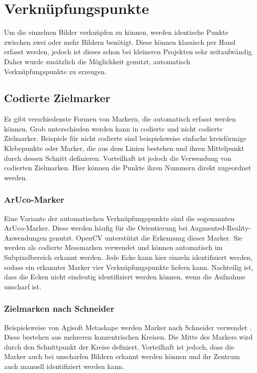 \documentclass[./00PhotoBox.tex]{subfiles}
\begin{document}
\section{Verknüpfungspunkte}
\label{s:verknuepfung}
Um die einzelnen Bilder verknüpfen zu können, werden identische Punkte zwischen zwei oder mehr Bildern benötigt. Diese können klassisch per Hand erfasst werden, jedoch ist dieses schon bei kleineren Projekten sehr zeitaufwändig. Daher wurde zusätzlich die Möglichkeit genutzt, automatisch Verknüpfungspunkte zu erzeugen.

\subsection{Codierte Zielmarker}
Es gibt verschiedenste Formen von Markern, die automatisch erfasst werden können. Grob unterschieden werden kann in codierte und nicht codierte Zielmarker. Beispiele für nicht codierte sind beispielsweise einfache kreisförmige Klebepunkte oder Marker, die aus dem Linien bestehen und ihren Mittelpunkt durch dessen Schnitt definieren.
Vorteilhaft ist jedoch die Verwendung von codierten Zielmarken. Hier können die Punkte ihren Nummern direkt zugeordnet werden.
\citep[S.535ff]{luhmann}

\subsubsection{ArUco-Marker}
Eine Variante der automatischen Verknüpfungspunkte sind die sogenannten ArUco-Marker. Diese werden häufig für die Orientierung bei Augmented-Reality-Anwend\-ungen genutzt. OpenCV unterstützt die Erkennung dieser Marker. Sie werden als codierte Messmarken verwendet und können automatisch im Subpixelbereich erkannt werden. Jede Ecke kann hier einzeln identifiziert werden, sodass ein erkannter Marker vier Verknüpfungspunkte liefern kann. Nachteilig ist, dass die Ecken nicht eindeutig identifiziert werden können, wenn die Aufnahme unscharf ist.

\subsubsection{Zielmarken nach Schneider}
Beispielsweise von Agisoft Metashape werden Marker nach Schneider verwendet \citep{ccct}. Diese bestehen aus mehreren konzentrischen Kreisen. Die Mitte des Markers wird durch den Schnittpunkt der Kreise definiert.  Vorteilhaft ist jedoch, dass die Marker auch bei unscharfen Bildern erkannt werden können und ihr Zentrum auch manuell identifiziert werden kann.
\end{document}
